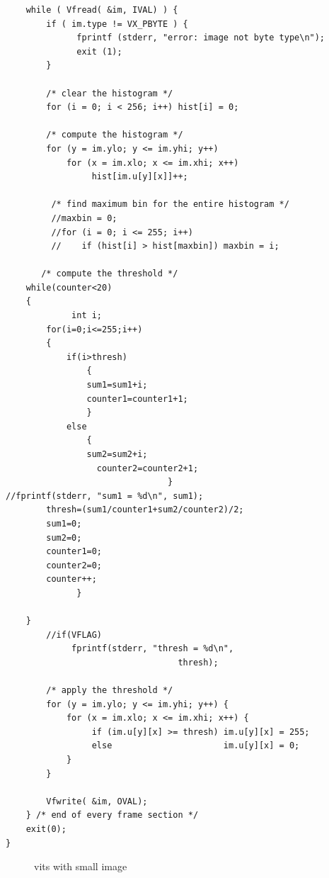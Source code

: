 \documentclass{article}
\begin{document}
\begin{lstlisting}
    while ( Vfread( &im, IVAL) ) {
        if ( im.type != VX_PBYTE ) {
              fprintf (stderr, "error: image not byte type\n");
              exit (1);
        }

        /* clear the histogram */
        for (i = 0; i < 256; i++) hist[i] = 0;

        /* compute the histogram */
        for (y = im.ylo; y <= im.yhi; y++)
            for (x = im.xlo; x <= im.xhi; x++)
                 hist[im.u[y][x]]++;

         /* find maximum bin for the entire histogram */
         //maxbin = 0;
         //for (i = 0; i <= 255; i++)
         //    if (hist[i] > hist[maxbin]) maxbin = i;

	   /* compute the threshold */
	while(counter<20)
	{
             int i;
		for(i=0;i<=255;i++)
		{	
			if(i>thresh)
				{
				sum1=sum1+i;
				counter1=counter1+1;
				}			
			else
				{				
				sum2=sum2+i;
			      counter2=counter2+1;
                                }
//fprintf(stderr, "sum1 = %d\n", sum1);
		thresh=(sum1/counter1+sum2/counter2)/2;
		sum1=0;
		sum2=0;
		counter1=0;
		counter2=0;
		counter++;
              }

	}
        //if(VFLAG)
             fprintf(stderr, "thresh = %d\n",
                                  thresh);

        /* apply the threshold */
        for (y = im.ylo; y <= im.yhi; y++) {
            for (x = im.xlo; x <= im.xhi; x++) {
                 if (im.u[y][x] >= thresh) im.u[y][x] = 255;
                 else                      im.u[y][x] = 0;
            }
        }

        Vfwrite( &im, OVAL);
    } /* end of every frame section */
    exit(0);
}
\end{lstlisting}

\begin{figure}[H]
\centering
{}%
%
\centering
\caption{ vits with small image}
\end{figure}
\end{document}
